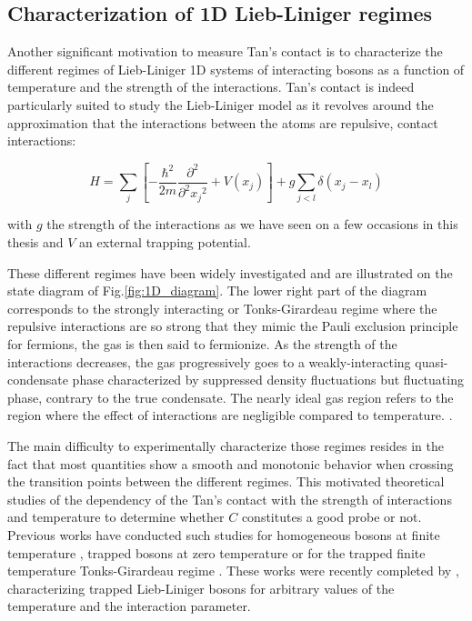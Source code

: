 \subsection{Characterization of 1D Lieb-Liniger regimes}

Another significant motivation to measure Tan's contact is to characterize the different regimes of Lieb-Liniger 1D systems of interacting bosons as a function of temperature and the strength of the interactions. Tan's contact is indeed particularly suited to study the Lieb-Liniger model as it revolves around the approximation that the interactions between the atoms are repulsive, contact interactions:

\begin{equation}
    H = \sum_j \left[ - \frac{ \hbar^2}{2m} \frac{\partial^2}{\partial^2 {x_j}^2} + V(x_j) \right] + g \sum_{j<l} \delta(x_j - x_l) 
    \label{eq:lieb_liniger}
\end{equation}

\noindent with $g$ the strength of the interactions as we have seen on a few occasions in this thesis and $V$ an external trapping potential. 


These different regimes have been widely investigated \cite{petrov2000regimes} and are illustrated on the state diagram of Fig.\ref{fig:1D_diagram}. The lower right part of the diagram corresponds to the strongly interacting or Tonks-Girardeau regime where the repulsive interactions are so strong that they mimic the Pauli exclusion principle for fermions, the gas is then said to fermionize. As the strength of the interactions decreases, the gas progressively goes to a weakly-interacting quasi-condensate phase characterized by suppressed density fluctuations but fluctuating phase, contrary to the true condensate. The nearly ideal gas region refers to the region where the effect of interactions are negligible compared to temperature. .

The main difficulty to experimentally characterize those regimes resides in the fact that most quantities show a smooth and monotonic behavior when crossing the transition points between the different regimes. This motivated theoretical studies of the dependency of the Tan's contact with the strength of interactions and temperature to determine whether $C$ constitutes a good probe or not. Previous works have conducted such studies for homogeneous bosons at finite temperature \cite{kheruntsyan2003pair,kormos2009expectation}, trapped bosons at zero temperature \cite{minguzzi2002high,olshanii2003short} or for the trapped finite temperature Tonks-Girardeau regime \cite{vignolo2013universal}. These works were recently completed by \cite{yao2018tan}, characterizing trapped Lieb-Liniger bosons for arbitrary values of the temperature and the interaction parameter.

